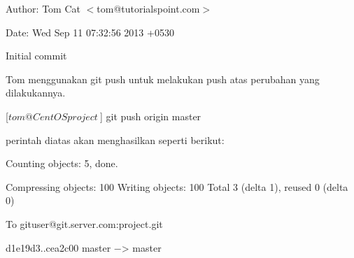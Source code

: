 \documentclass[12pt,a4paper]{article}
\begin{document}
Author: Tom Cat $<$tom@tutorialspoint.com$>$

Date: Wed Sep 11 07:32:56 2013 +0530

Initial commit\vspace{12pt}

Tom menggunakan git push untuk melakukan push atas perubahan yang dilakukannya.\par
\vspace{12pt}
[$tom@CentOS project ~$] git push origin master\par
\vspace{12pt}
perintah diatas akan menghasilkan seperti berikut:\par
\vspace{12pt}
Counting objects: 5, done.\par
\vspace{12pt}
Compressing objects: 100%
\vspace{12pt}
Writing objects: 100%
\vspace{12pt}
Total 3 (delta 1), reused 0 (delta 0)\par
\vspace{12pt}
To gituser@git.server.com:project.git\par
\vspace{12pt}
d1e19d3..cea2c00 master −> master\par
\end{document}
